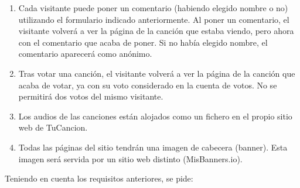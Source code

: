 \begin{enumerate}
  \item Cada visitante puede poner un comentario (habiendo elegido nombre o no) utilizando el formulario indicado anteriormente. Al poner un comentario, el visitante volverá a ver la página de la canción que estaba viendo, pero ahora con el comentario que acaba de poner. Si no había elegido nombre, el comentario aparecerá como anónimo.
  \item Tras votar una canción, el visitante volverá a ver la página de la canción que acaba de votar, ya con su voto considerado en la cuenta de votos. No se permitirá dos votos del mismo visitante.
  \item Los audios de las canciones están alojados como un fichero en el propio sitio web de TuCancion.
  \item Todas las páginas del sitio tendrán una imagen de cabecera (banner). Esta imagen será servida por un sitio web distinto (MisBanners.io).
\end{enumerate}

\newpage

Teniendo en cuenta los requisitos anteriores, se pide:

